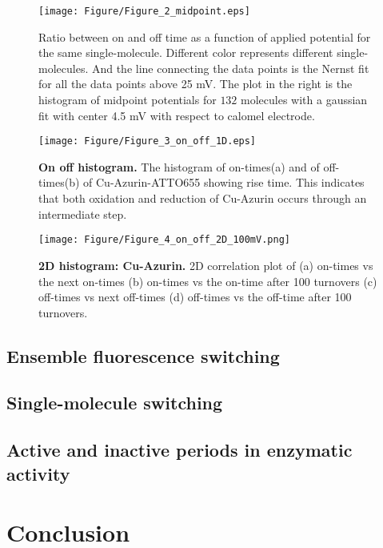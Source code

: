 \begin{figure}
	\texttt{[image: Figure/Figure\_2\_midpoint.eps]}
	\caption{Ratio between on and off time as a function of applied potential for the same single-molecule. Different color represents different single-molecules. And the line connecting the data points is the Nernst fit for all the data points above 25 mV. The plot in the right is the histogram of midpoint potentials for $132$ molecules with a gaussian fit with center 4.5 mV with respect to calomel electrode.}
	\label{fig:midpoint}
\end{figure}
\begin{figure}
	\texttt{[image: Figure/Figure\_3\_on\_off\_1D.eps]}
	\caption{\textbf{On off histogram.} The histogram of on-times(a) and of off-times(b) of Cu-Azurin-ATTO655 showing rise time. This indicates that both oxidation and reduction of Cu-Azurin occurs through an intermediate step.}
	\label{fig:onoff1D}
\end{figure}
\begin{figure}
	\texttt{[image: Figure/Figure\_4\_on\_off\_2D\_100mV.png]}
	\caption{\textbf{2D histogram: Cu-Azurin.} 2D correlation plot of (a) on-times vs the next on-times (b) on-times vs the on-time after 100 turnovers (c) off-times vs next off-times (d) off-times vs the off-time after 100 turnovers.}
	\label{fig:onoff2D}
\end{figure}
\subsection{Ensemble fluorescence switching}
\subsection{Single-molecule switching}
\subsection{Active and inactive periods in enzymatic activity}
\section{Conclusion}